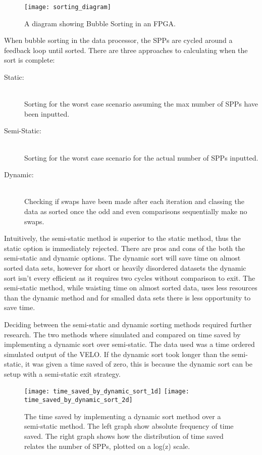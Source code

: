 			\begin{figure}[ht]
				\centering
				\texttt{[image: sorting\_diagram]}
				\caption{A diagram showing Bubble Sorting in an FPGA.}
				\label{fig:sorting}
			\end{figure}

			When bubble sorting in the data processor, the SPPs are cycled around a feedback loop until sorted.
			There are three approaches to calculating when the sort is complete:

			\begin{description}
				\item [Static:] \hfill \\ Sorting for the worst case scenario assuming the max number of SPPs have been inputted.
				\item [Semi-Static:] \hfill \\ Sorting for the worst case scenario for the actual number of SPPs inputted.
				\item [Dynamic:] \hfill \\ Checking if swaps have been made after each iteration and classing the data as sorted once the odd and even comparisons sequentially make no swaps.
			\end{description}			

			Intuitively, the semi-static method is superior to the static method, thus the static option is immediately rejected.
			There are pros and cons of the both the semi-static and dynamic options. 
			The dynamic sort will save time on almost sorted data sets, however for short or heavily disordered datasets the dynamic sort isn't every efficient as it requires two cycles without comparison to exit.
			The semi-static method, while waisting time on almost sorted data, uses less resources than the dynamic method and for smalled data sets there is less opportunity to save time.

			Deciding between the semi-static and dynamic sorting methods required further research.
			The two methods where simulated and compared on time saved by implementing a dynamic sort over semi-static.
			The data used was a time ordered simulated output of the VELO.
			If the dynamic sort took longer than the semi-static, it was given a time saved of zero, this is because the dynamic sort can be setup with a semi-static exit strategy.

			\begin{figure}[ht]
				\centering
				\texttt{[image: time\_saved\_by\_dynamic\_sort\_1d]}
				\texttt{[image: time\_saved\_by\_dynamic\_sort\_2d]}
				\caption{The time saved by implementing a dynamic sort method over a semi-static method. The left graph show absolute frequency of time saved. The right graph shows how the distribution of time saved relates the number of SPPs, plotted on a log(z) scale.}
				\label{fig:dyn_stat_comp}
			\end{figure}			

